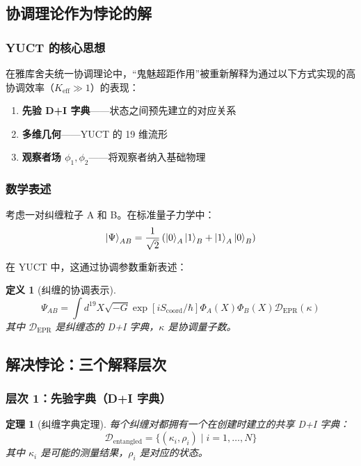 \documentclass[11pt,a4paper]{article}
\newtheorem{theorem}{定理}
\newtheorem{definition}{定义}
\begin{document}
	\subsection{协调理论作为悖论的解}
	\label{subsec:yuct-solution}
	
	\subsubsection{YUCT 的核心思想}
	在雅库舍夫统一协调理论中，“鬼魅超距作用”被重新解释为通过以下方式实现的高协调效率（$K_{\mathrm{eff}} \gg 1$）的表现：
	
	\begin{enumerate}
		\item \textbf{先验 D+I 字典}——状态之间预先建立的对应关系
		\item \textbf{多维几何}——YUCT 的 19 维流形
		\item \textbf{观察者场 $\phi_1, \phi_2$}——将观察者纳入基础物理
	\end{enumerate}
	
	\subsubsection{数学表述}
	考虑一对纠缠粒子 A 和 B。在标准量子力学中：
	\begin{equation}
		\ket{\Psi}_{AB} = \frac{1}{\sqrt{2}} \left( \ket{0}_A \ket{1}_B + \ket{1}_A \ket{0}_B \right)
	\end{equation}
	
	在 YUCT 中，这通过协调参数重新表述：
	
	\begin{definition}[纠缠的协调表示]
		\begin{equation}
			\Psi_{AB} = \int d^{19}X \sqrt{-G} \exp\left[i S_{\text{coord}}/\hbar\right] \Phi_A(X) \Phi_B(X) \mathcal{D}_{\text{EPR}}(\kappa)
		\end{equation}
		其中 $\mathcal{D}_{\text{EPR}}$ 是纠缠态的 D+I 字典，$\kappa$ 是协调量子数。
	\end{definition}
	
	\subsection{解决悖论：三个解释层次}
	\label{subsec:three-levels}
	
	\subsubsection{层次 1：先验字典（D+I 字典）}
	\begin{theorem}[纠缠字典定理]
		每个纠缠对都拥有一个在创建时建立的共享 D+I 字典：
		\begin{equation}
			\mathcal{D}_{\text{entangled}} = \{(\kappa_i, \rho_i) \mid i = 1,\dots,N\}
		\end{equation}
		其中 $\kappa_i$ 是可能的测量结果，$\rho_i$ 是对应的状态。
	\end{theorem}
	
\end{document}
